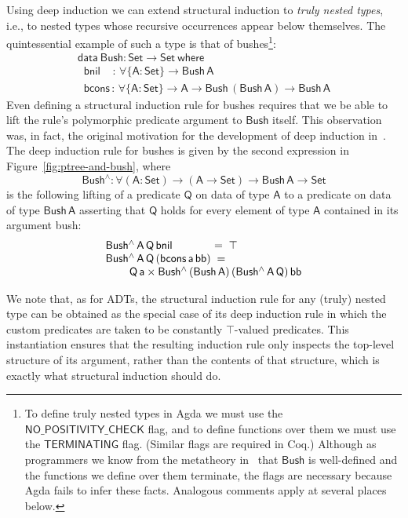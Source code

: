 \documentclass[sigplan,screen]{acmart}
\begin{document}
Using deep induction we can extend structural induction to {\em truly
  nested types}, i.e., to nested types whose recursive occurrences
appear below themselves. The quintessential example of such a type is
that of bushes\footnote{To define truly nested types in Agda we must
  use the $\mathsf{NO\_POSITIVITY\_CHECK}$ flag, and to define
  functions over them we must use the $\mathsf{TERMINATING}$ flag.
  (Similar flags are required in Coq.) Although as programmers we know
  from the metatheory in~\cite{jp19} that $\mathsf{Bush}$ is
  well-defined and the functions we define over them terminate, the
  flags are necessary because Agda fails to infer these
  facts. Analogous comments apply at several places
  below.}\cite{bm98}:
\begin{equation*}\label{eq:bush}
\begin{array}{l}
\mathsf{data\ Bush : Set \to Set\ where}\\
\mathsf{\;\;bnil\,\,\,\,\,\; :\, \forall \{A : Set\} \to Bush\,A}\\
\mathsf{\;\;bcons\, :\, \forall \{A : Set\} \to A \to Bush\,(Bush\,A) \to Bush\,A} 
\end{array}
\end{equation*}
Even defining a structural induction rule for bushes requires that we
be able to lift the rule's polymorphic predicate argument to
$\mathsf{Bush}$ itself. This observation was, in fact, the original
motivation for the development of deep induction in~\cite{jp20}. The
deep induction rule for bushes is given by the second expression in
Figure~\ref{fig:ptree-and-bush}, where
\[\mathsf{Bush^{\wedge} :
  \forall (A : Set) \to (A \to Set) \to Bush\,A \to Set}\]
is the following lifting of a predicate $\mathsf{Q}$ on data of type
$\mathsf{A}$ to a predicate on data of type $\mathsf{Bush\,A}$
asserting that $\mathsf{Q}$ holds for every element of type
$\mathsf{A}$ contained in its argument bush:
\begin{equation}
\begin{array}{l}
\mathsf{Bush^{\wedge}\,A\,Q\,bnil} \hspace*{0.49in} = \; \mathsf{\top} \\
\mathsf{Bush^{\wedge}\,A\,Q\,(bcons\,a\,bb)} \; = \;\\
\hspace*{0.3in}\mathsf{Q\,a \times Bush^{\wedge}\,(Bush\,A)\,(Bush^{\wedge}\,A\,Q)\,bb} 
\end{array}
\end{equation}

We note that, as for ADTs, the structural induction rule for any
(truly) nested type can be obtained as the special case of its deep
induction rule in which the custom predicates are taken to be
constantly $\mathsf{\top}$-valued predicates. This instantiation
ensures that the resulting induction rule only inspects the top-level
structure of its argument, rather than the contents of that structure,
which is exactly what structural induction should do.
\end{document}
